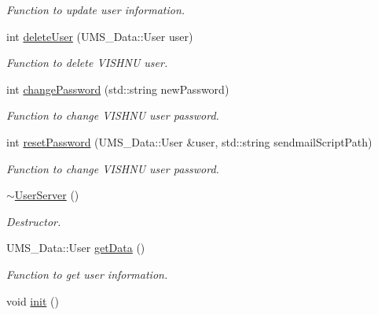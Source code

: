 \begin{DoxyCompactItemize}
\begin{DoxyCompactList}\small\item\em Function to update user information. \item\end{DoxyCompactList}\item 
int \hyperlink{classUserServer_acb26d67e359123b9b4b80fa007d37423}{deleteUser} (UMS\_\-Data::User user)
\begin{DoxyCompactList}\small\item\em Function to delete VISHNU user. \item\end{DoxyCompactList}\item 
int \hyperlink{classUserServer_a63b49fc59574e8b81fde104f09a4585e}{changePassword} (std::string newPassword)
\begin{DoxyCompactList}\small\item\em Function to change VISHNU user password. \item\end{DoxyCompactList}\item 
int \hyperlink{classUserServer_ad25cf22ec48e1519df9fd68b1d66a36d}{resetPassword} (UMS\_\-Data::User \&user, std::string sendmailScriptPath)
\begin{DoxyCompactList}\small\item\em Function to change VISHNU user password. \item\end{DoxyCompactList}\item 
\hypertarget{classUserServer_a12cc28c2c2c5b3c88d2f760c97bd088d}{
\hyperlink{classUserServer_a12cc28c2c2c5b3c88d2f760c97bd088d}{$\sim$UserServer} ()}
\label{classUserServer_a12cc28c2c2c5b3c88d2f760c97bd088d}

\begin{DoxyCompactList}\small\item\em Destructor. \item\end{DoxyCompactList}\item 
UMS\_\-Data::User \hyperlink{classUserServer_a539501563b61edfcb374ad6954b3d930}{getData} ()
\begin{DoxyCompactList}\small\item\em Function to get user information. \item\end{DoxyCompactList}\item 
\hypertarget{classUserServer_a0aad281d77ffbe98423f3275884781c1}{
void \hyperlink{classUserServer_a0aad281d77ffbe98423f3275884781c1}{init} ()}
\label{classUserServer_a0aad281d77ffbe98423f3275884781c1}


\end{DoxyCompactItemize}
